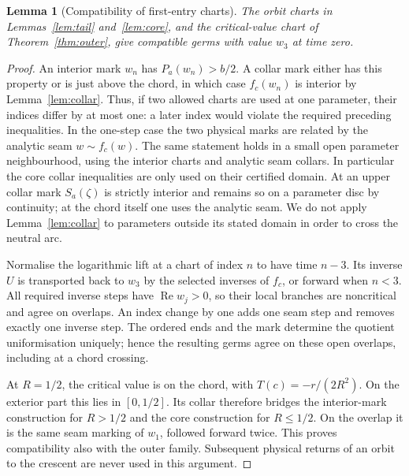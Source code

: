 \documentclass[11pt]{article}
\newtheorem{lemma}[theorem]{Lemma}
\newcommand{\re}{\operatorname{Re}}
\begin{document}
\begin{lemma}[Compatibility of first-entry charts]\label{lem:entry-patch}
The orbit charts in Lemmas~\ref{lem:tail} and~\ref{lem:core}, and the
critical-value chart of Theorem~\ref{thm:outer}, give compatible germs
with value $w_3$ at time zero.
\end{lemma}
\begin{proof}
An interior mark $w_n$ has $P_a(w_n)>b/2$. A collar mark either has this
property or is just above the chord, in which case $f_c(w_n)$ is interior
by Lemma~\ref{lem:collar}. Thus, if two allowed charts are used at one
parameter, their indices differ by at most one: a later index would
violate the required preceding inequalities. In the one-step case the
two physical marks are related by the analytic seam $w\sim f_c(w)$.
The same statement holds in a small open parameter neighbourhood,
using the interior charts and analytic seam collars. In particular the
core collar inequalities are only used on their certified domain. At an
upper collar mark $S_a(\zeta)$ is strictly interior and remains so on
a parameter disc by continuity; at the chord itself one uses the analytic
seam. We do not apply Lemma~\ref{lem:collar} to parameters outside its
stated domain in order to cross the neutral arc.

Normalise the logarithmic lift at a chart of index $n$ to have time $n-3$.
Its inverse $U$ is transported back to $w_3$ by the selected inverses
of $f_c$, or forward when $n<3$. All required inverse steps have
$\re w_j>0$, so their local branches are noncritical and agree on
overlaps. An index change by one adds one seam step and removes exactly
one inverse step. The ordered ends and the mark determine the quotient
uniformisation uniquely; hence the resulting germs agree on these
open overlaps, including at a chord crossing.

At $R=1/2$, the critical value is on the chord, with
$T(c)=-r/(2R^2)$. On the exterior part this lies in $[0,1/2]$.
Its collar therefore bridges the interior-mark construction for $R>1/2$
and the core construction for $R\le1/2$. On the overlap it is the same
seam marking of $w_1$, followed forward twice. This proves compatibility
also with the outer family. Subsequent physical returns of an orbit to
the crescent are never used in this argument.
\end{proof}
\end{document}
